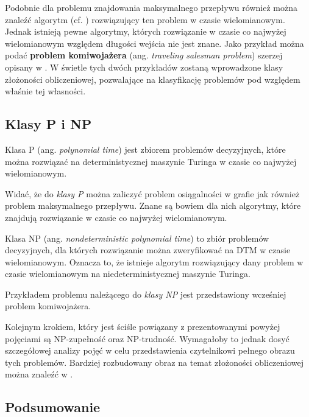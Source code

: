Podobnie dla problemu znajdowania maksymalnego przepływu również można znaleźć algorytm (cf. \cite{ZlozonoscObliczeniowa}) rozwiązujący ten problem w czasie wielomianowym. Jednak istnieją pewne algorytmy, których rozwiązanie w czasie co najwyżej wielomianowym względem długości wejścia nie jest znane. Jako przykład można podać \textbf{problem komiwojażera} (ang. \textit{traveling salesman problem}) szerzej opisany w \cite{ZlozonoscObliczeniowa}. W świetle tych dwóch przykładów zostaną wprowadzone klasy złożoności obliczeniowej, pozwalające na klasyfikację problemów pod względem właśnie tej własności.

\subsection{Klasy P i NP}

\begin{definition}
Klasa P (ang. \textit{polynomial time}) jest zbiorem problemów decyzyjnych, które można rozwiązać na deterministycznej maszynie Turinga w czasie co najwyżej wielomianowym.
\end{definition}
Widać, że do \textit{klasy P} można zaliczyć problem osiągalności w grafie jak również problem maksymalnego przepływu. Znane są bowiem dla nich algorytmy, które znajdują rozwiązanie w czasie co najwyżej wielomianowym.

\begin{definition}
Klasa NP (ang. \textit{nondeterministic polynomial time}) to zbiór problemów decyzyjnych, dla których rozwiązanie można zweryfikować na DTM w czasie wielomianowym. Oznacza to, że istnieje algorytm rozwiązujący dany problem w czasie wielomianowym na niedeterministycznej maszynie Turinga.
\end{definition}
Przykładem problemu należącego do \textit{klasy NP} jest przedstawiony wcześniej problem komiwojażera.

Kolejnym krokiem, który jest ściśle powiązany z prezentowanymi powyżej pojęciami są NP-zupełność oraz NP-trudność. Wymagałoby to jednak dosyć szczegółowej analizy pojęć w celu przedstawienia czytelnikowi pełnego obrazu tych problemów. Bardziej rozbudowany obraz na temat złożoności obliczeniowej można znaleźć w \cite{ZlozonoscObliczeniowa}. 

\subsection{Podsumowanie}

